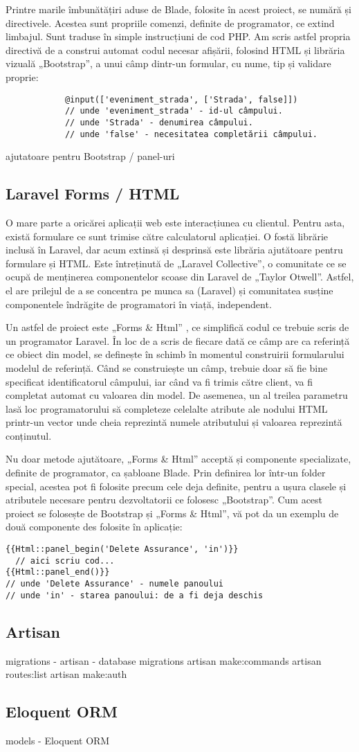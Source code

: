 		Printre marile îmbunătățiri aduse de Blade, folosite în acest proiect, se numără și directivele.
		Acestea sunt propriile comenzi, definite de programator, ce extind limbajul.
		Sunt traduse în simple instrucțiuni de cod PHP.
		Am scris astfel propria directivă de a construi automat codul necesar afișării, folosind HTML și librăria vizuală „Bootstrap”, a unui câmp dintr-un formular, cu nume, tip și validare proprie:
		\begin{verbatim}
			@input(['eveniment_strada', ['Strada', false]])
			// unde 'eveniment_strada' - id-ul câmpului.
			// unde 'Strada' - denumirea câmpului.
			// unde 'false' - necesitatea completării câmpului.
		\end{verbatim}
		ajutatoare pentru Bootstrap / panel-uri
	\subsection{Laravel Forms / HTML}

		O mare parte a oricărei aplicații web este interacțiunea cu clientul.
		Pentru asta, există formulare ce sunt trimise către calculatorul aplicației.
		O fostă librărie inclusă în Laravel, dar acum extinsă și desprinsă este librăria ajutătoare pentru formulare și HTML.
		Este întreținută de „Laravel Collective”, o comunitate ce se ocupă de menținerea componentelor scoase din Laravel de „Taylor Otwell”.
		Astfel, el are prilejul de a se concentra pe munca sa (Laravel) și comunitatea susține componentele îndrăgite de programatori în viață, independent.\cite{laravel_collective_about}

		Un astfel de proiect este „Forms \& Html” \cite{laravel_collective_forms}, ce simplifică codul ce trebuie scris de un programator Laravel.
		În loc de a scris de fiecare dată ce câmp are ca referință ce obiect din model, se definește în schimb în momentul construirii formularului modelul de referință.
		Când se construiește un câmp, trebuie doar să fie bine specificat identificatorul câmpului, iar când va fi trimis către client, va fi completat automat cu valoarea din model.
		De asemenea, un al treilea parametru lasă loc programatorului să completeze celelalte atribute ale nodului HTML printr-un vector unde cheia reprezintă numele atributului și valoarea reprezintă conținutul.

		Nu doar metode ajutătoare, „Forms \& Html” acceptă și componente specializate, definite de programator, ca șabloane Blade.
		Prin definirea lor într-un folder special, acestea pot fi folosite precum cele deja definite, pentru a ușura clasele și atributele necesare pentru dezvoltatorii ce folosesc „Bootstrap”.
		Cum acest proiect se folosește de Bootstrap și „Forms \& Html”, vă pot da un exemplu de două componente des folosite în aplicație:
		\begin{Verbatim}
{{Html::panel_begin('Delete Assurance', 'in')}}
  // aici scriu cod...
{{Html::panel_end()}}
// unde 'Delete Assurance' - numele panoului
// unde 'in' - starea panoului: de a fi deja deschis
		\end{Verbatim}

	\subsection{Artisan}
		migrations - artisan - database migrations
		artisan make:commands
		artisan routes:list
		artisan make:auth
	\subsection{Eloquent ORM}
		models - Eloquent ORM
